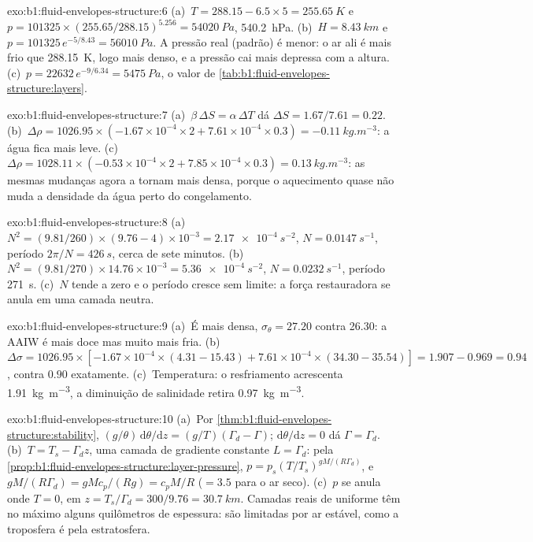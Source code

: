 \begin{solution}{exo:b1:fluid-envelopes-structure:6}
(a)~$T = 288.15 - 6.5 \times 5 = \qty{255.65}{K}$ e $p = \num{101325} \times
(255.65/288.15)^{5.256} = \qty{54020}{Pa}$, \qty{540.2}{hPa}. (b)~$H =
\qty{8.43}{km}$ e $p = \num{101325}\,e^{-5/8.43} = \qty{56010}{Pa}$. A pressão real
(padrão) é menor: o ar ali é mais frio que \qty{288.15}{K}, logo mais denso, e a pressão
cai mais depressa com a altura. (c)~$p = \num{22632}\,
e^{-9/6.34} = \qty{5475}{Pa}$, o valor de
\cref{tab:b1:fluid-envelopes-structure:layers}.
\end{solution}

\begin{solution}{exo:b1:fluid-envelopes-structure:7}
(a)~$\beta\,\Delta S = \alpha\,\Delta T$ dá $\Delta S = 1.67/7.61 = 0.22$.
(b)~$\Delta\rho = 1026.95 \times (-1.67\times10^{-4} \times 2 + 7.61\times10^{-4}
\times 0.3) = \qty{-0.11}{kg.m^{-3}}$: a água fica mais leve.
(c)~$\Delta\rho = 1028.11 \times (-0.53\times10^{-4} \times 2 + 7.85\times10^{-4}
\times 0.3) = \qty{+0.13}{kg.m^{-3}}$: as mesmas mudanças agora a tornam mais densa, porque
o aquecimento quase não muda a densidade da água perto do congelamento.
\end{solution}

\begin{solution}{exo:b1:fluid-envelopes-structure:8}
(a)~$N^2 = (9.81/260) \times (9.76 - 4)\times10^{-3} = \qty{2.17e-4}{s^{-2}}$,
$N = \qty{0.0147}{s^{-1}}$, período $2\pi/N = \qty{426}{s}$, cerca de sete
minutos. (b)~$N^2 = (9.81/270) \times 14.76\times10^{-3} = \qty{5.36e-4}{s^{-2}}$,
$N = \qty{0.0232}{s^{-1}}$, período \qty{271}{s}. (c)~$N$ tende a zero e o período
cresce sem limite: a força restauradora se anula em uma camada neutra.
\end{solution}

\begin{solution}{exo:b1:fluid-envelopes-structure:9}
(a)~É mais densa, $\sigma_\theta = 27.20$ contra 26.30: a AAIW é mais doce mas muito mais fria.
(b)~$\Delta\sigma = 1026.95 \times [-1.67\times10^{-4} \times
(4.31 - 15.43) + 7.61\times10^{-4} \times (34.30 - 35.54)] = 1.907 - 0.969 =
0.94$, contra $0.90$ exatamente. (c)~Temperatura: o resfriamento acrescenta
\qty{1.91}{kg.m^{-3}}, a diminuição de salinidade retira \qty{0.97}{kg.m^{-3}}.
\end{solution}

\begin{solution}{exo:b1:fluid-envelopes-structure:10}
(a)~Por \cref{thm:b1:fluid-envelopes-structure:stability}, $(g/\theta)\,\mathrm
d\theta/\mathrm dz = (g/T)(\Gamma_d - \Gamma)$; $\mathrm d\theta/\mathrm dz = 0$
dá $\Gamma = \Gamma_d$. (b)~$T = T_s - \Gamma_d z$, uma camada de gradiente constante
$L = \Gamma_d$: pela \cref{prop:b1:fluid-envelopes-structure:layer-pressure}, $p =
p_s (T/T_s)^{gM/(R\Gamma_d)}$, e $gM/(R\Gamma_d) = gMc_p/(Rg) = c_pM/R$
($= 3.5$ para o ar seco). (c)~$p$ se anula onde $T = 0$, em $z = T_s/\Gamma_d =
300/9.76 = \qty{30.7}{km}$. Camadas reais de  uniforme têm
no máximo alguns quilômetros de espessura: são limitadas por ar estável, como a
troposfera é pela estratosfera.
\end{solution}

